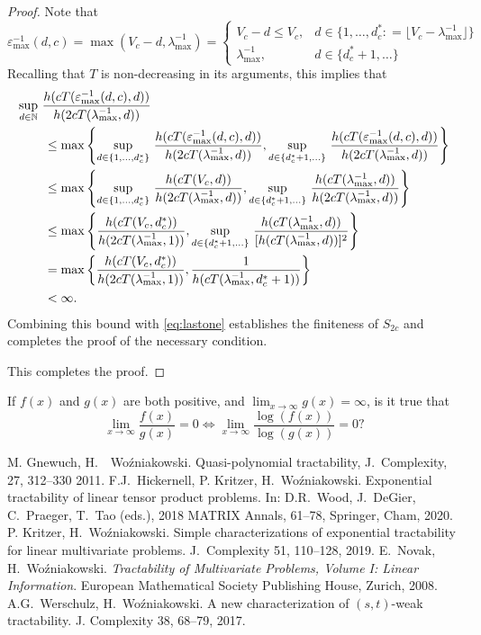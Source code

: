\documentclass[11pt,a4paper]{article}
\begin{document}
\begin{proof}
Note that 
\[
\varepsilon^{-1}_{\max}(d,c) = \max(V_c - d,\lambda_{\max}^{-1}) 
= \begin{cases} V_c - d \le V_c, & d \in \{1, \ldots, d^*_c : = \lfloor V_c - \lambda_{\max}^{-1} \rfloor\} \\
\lambda_{\max}^{-1}, & d \in \{d^*_c+1, \ldots\}
\end{cases}
\]
Recalling that $T$ is non-decreasing in its arguments, this implies that 
\begin{align*}
    \MoveEqLeft{\sup_{d\in\naturals} \,
		 \frac{ h(cT(\varepsilon^{-1}_{\max}(d,c),d))}{h(2cT(\lambda_{\max}^{-1},d))}}\\
  &\le \max \left \{  
  \sup_{d \in \{1, \ldots, d^*_c\}} \,
		 \frac{ h(cT(\varepsilon^{-1}_{\max}(d,c),d))}{h(2cT(\lambda_{\max}^{-1},d))}, 
  \sup_{d\in \{d^*_c+1, \ldots \}} \,
		 \frac{ h(cT(\varepsilon^{-1}_{\max}(d,c),d))}{h(2cT(\lambda_{\max}^{-1},d))}
  \right \} \\
  & \le \max \left \{  
  \sup_{d \in \{1, \ldots, d^*_c\}}  \,
		 \frac{ h(cT(V_c,d))}{h(2cT(\lambda_{\max}^{-1},d))}
  , 
  \sup_{d\in \{d^*_c+1, \ldots \}}  \,
		 \frac{ h(cT(\lambda_{\max}^{-1},d))}{h(2cT(\lambda_{\max}^{-1},d))}
  \right \}
  \\
  & \le \max \left \{  
		 \frac{ h(cT(V_c,d^*_c))}{h(2cT(\lambda_{\max}^{-1},1))}, 
  \sup_{d\in \{d^*_c+1, \ldots \}}  \,
		 \frac{ h(cT(\lambda_{\max}^{-1},d))}{[h(cT(\lambda_{\max}^{-1},d))]^2}
  \right \} \\
  & = \max \left \{  
		 \frac{ h(cT(V_c,d^*_c))}{h(2cT(\lambda_{\max}^{-1},1))}, 
		 \frac{1}{h(cT(\lambda_{\max}^{-1},d_c^*+1))}
  \right \} \\
  & < \infty.
\end{align*}
Combining this bound with \eqref{eq:lastone} establishes the finiteness of $S_{2c}$ and completes the proof of the necessary condition.

	\bigskip

This completes the proof.
\end{proof}

If $f(x)$ and $g(x)$ are both positive, and $\lim_{x \to \infty} g(x) = \infty$, is it true that
\[
\lim_{x \to \infty} \frac{f(x)}{g(x)} = 0 \iff 
\lim_{x \to \infty} \frac{\log(f(x))}{\log(g(x))} = 0?
\]

\begin{thebibliography}{99}
 M. Gnewuch, H.~~Wo\'zniakowski. Quasi-polynomial tractability, J.~Complexity, 27, 312--330 2011.
 F.J.~Hickernell, P. Kritzer, H.~Wo\'zniakowski.  Exponential tractability of linear tensor product problems. In: 
D.R.~Wood, J.~DeGier, C.~Praeger, T.~Tao (eds.), 2018 MATRIX Annals, 61--78, Springer, Cham, 2020. 
 P. Kritzer, H.~Wo\'zniakowski.
Simple characterizations of exponential tractability for linear
multivariate problems. J.~Complexity 51, 110--128, 2019.
 E.~Novak, H.~Wo\'zniakowski. \textit{Tractability of Multivariate Problems, Volume I: Linear Information}.
European Mathematical Society Publishing House, Zurich, 2008.
  A.G.~Werschulz, H.~Wo\'zniakowski. A new characterization of $(s,t)$-weak tractability. J. Complexity 38, 68--79, 2017. 

\end{thebibliography}
\end{document}
